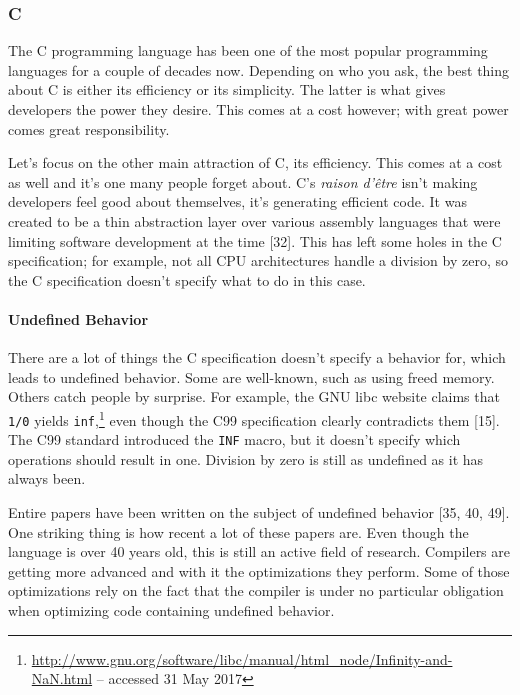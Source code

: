 \documentclass[a4paper, 16pt, oneside]{Thesis}
\let\oldparagraph\paragraph
\renewcommand{\paragraph}[1]{\oldparagraph{#1}\mbox{}}
\begin{document}
\subsubsection{C}\label{c}

The C programming language has been one of the most popular programming
languages for a couple of decades now. Depending on who you ask, the
best thing about C is either its efficiency or its simplicity. The
latter is what gives developers the power they desire. This comes at a
cost however; with great power comes great responsibility.

Let's focus on the other main attraction of C, its efficiency. This
comes at a cost as well and it's one many people forget about. C's
\emph{raison d'être} isn't making developers feel good about themselves,
it's generating efficient code. It was created to be a thin abstraction
layer over various assembly languages that were limiting software
development at the time {[}32{]}. This has left some holes in the C
specification; for example, not all CPU architectures handle a division
by zero, so the C specification doesn't specify what to do in this case.

\paragraph{Undefined Behavior}\label{undefined-behavior}

There are a lot of things the C specification doesn't specify a behavior
for, which leads to undefined behavior. Some are well-known, such as
using freed memory. Others catch people by surprise. For example, the
GNU libc website claims that \texttt{1/0} yields \texttt{inf},\footnote{\url{http://www.gnu.org/software/libc/manual/html_node/Infinity-and-NaN.html}
  -- accessed 31 May 2017} even though the C99 specification clearly
contradicts them {[}15{]}. The C99 standard introduced the \texttt{INF}
macro, but it doesn't specify which operations should result in one.
Division by zero is still as undefined as it has always been.

Entire papers have been written on the subject of undefined behavior
{[}35, 40, 49{]}. One striking thing is how recent a lot of these papers
are. Even though the language is over 40 years old, this is still an
active field of research. Compilers are getting more advanced and with
it the optimizations they perform. Some of those optimizations rely on
the fact that the compiler is under no particular obligation when
optimizing code containing undefined behavior.
\end{document}
